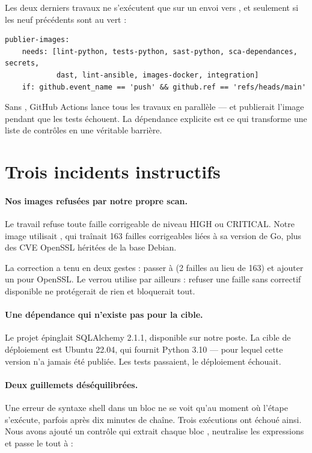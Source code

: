 Les deux derniers travaux ne s'exécutent que sur un envoi vers , et
seulement si les neuf précédents sont au vert :

\begin{lstlisting}[language=yamlplus]
  publier-images:
    needs: [lint-python, tests-python, sast-python, sca-dependances, secrets,
            dast, lint-ansible, images-docker, integration]
    if: github.event_name == 'push' && github.ref == 'refs/heads/main'
\end{lstlisting}

\begin{retenir}
Sans , GitHub Actions lance tous les travaux en parallèle --- et
publierait l'image pendant que les tests échouent. La dépendance explicite
est ce qui transforme une liste de contrôles en une véritable barrière.
\end{retenir}

\section{Trois incidents instructifs}

\paragraph{Nos images refusées par notre propre scan.} Le travail
 refuse toute faille corrigeable de niveau HIGH ou
CRITICAL. Notre image utilisait , qui traînait 163 failles
corrigeables liées à sa version de Go, plus des CVE OpenSSL héritées de la
base Debian.

La correction a tenu en deux gestes : passer à  (2 failles
au lieu de 163) et ajouter un  pour OpenSSL. Le verrou
utilise par ailleurs  : refuser une faille sans correctif
disponible ne protégerait de rien et bloquerait tout.

\paragraph{Une dépendance qui n'existe pas pour la cible.} Le projet épinglait
SQLAlchemy 2.1.1, disponible sur notre poste. La cible de déploiement est
Ubuntu 22.04, qui fournit Python 3.10 --- pour lequel cette version n'a jamais
été publiée. Les tests passaient, le déploiement échouait.

\paragraph{Deux guillemets déséquilibrées.} Une erreur de syntaxe shell dans un
bloc  ne se voit qu'au moment où l'étape s'exécute, parfois après dix
minutes de chaîne. Trois exécutions ont échoué ainsi. Nous avons ajouté un
contrôle qui extrait chaque bloc , neutralise les expressions
\cmd{\$\{\{ \}\}} et passe le tout à  :

